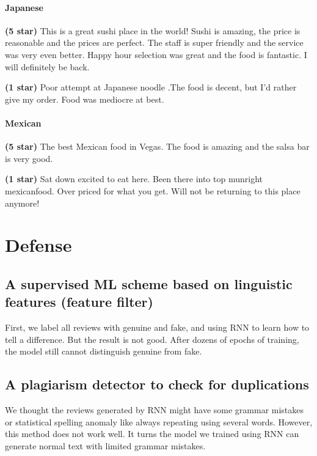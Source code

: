 \documentclass[conference]{IEEEtran}
\begin{document}
\paragraph{Japanese}
\par\textbf{(5 star)} This is a great sushi place in the world! Sushi is amazing, the price is reasonable and the prices are perfect. The staff is super friendly and the service was very even better. Happy hour selection was great and the food is fantastic. I will definitely be back.
\par\textbf{(1 star)} Poor attempt at Japanese noodle .The food is decent, but I'd rather give my order. Food was mediocre at best.

\paragraph{Mexican}
\par\textbf{(5 star)} The best Mexican food in Vegas. The food is amazing and the salsa bar is very good.
\par\textbf{(1 star)} Sat down excited to eat here. Been there into top munright mexicanfood. Over priced for what you get. Will not be returning to this place anymore!


\section{Defense}
\subsection{A supervised ML scheme based on linguistic features (feature filter)}
\par First, we label all reviews with genuine and fake, and using RNN to learn how to tell a difference. But the result is not good. After dozens of epochs of training, the model still cannot distinguish genuine from fake.

\subsection {A plagiarism detector to check for duplications}
\par We thought the reviews generated by RNN might have some grammar mistakes or statistical spelling anomaly like always repeating using several words. However, this method does not work well. It turns the model we trained using RNN can generate normal text with limited grammar mistakes. 
\end{document}
